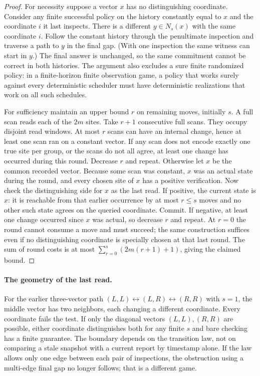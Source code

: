 \documentclass[11pt]{article}
\begin{document}
\begin{proof}
For necessity suppose a vector $x$ has no distinguishing coordinate. Consider any finite successful policy on the history constantly equal to $x$ and the coordinate $i$ it last inspects. There is a different $y\in N_s(x)$ with the same coordinate $i$. Follow the constant history through the penultimate inspection and traverse a path to $y$ in the final gap. (With one inspection the same witness can start in $y$.) The final answer is unchanged, so the same commitment cannot be correct in both histories. The argument also excludes a sure finite randomized policy: in a finite-horizon finite observation game, a policy that works surely against every deterministic scheduler must have deterministic realizations that work on all such schedules.

For sufficiency maintain an upper bound $r$ on remaining moves, initially $s$. A full scan reads each of the $2m$ sites. Take $r+1$ consecutive full scans. They occupy disjoint read windows. At most $r$ scans can have an internal change, hence at least one scan ran on a constant vector. If any scan does not encode exactly one true site per group, or the scans do not all agree, at least one change has occurred during this round. Decrease $r$ and repeat. Otherwise let $x$ be the common recorded vector. Because some scan was constant, $x$ was an actual state during the round, and every chosen site of $x$ has a positive verification. Now check the distinguishing side for $x$ as the last read. If positive, the current state is $x$: it is reachable from that earlier occurrence by at most $r\le s$ moves and no other such state agrees on the queried coordinate. Commit. If negative, at least one change occurred since $x$ was actual, so decrease $r$ and repeat. At $r=0$ the round cannot consume a move and must succeed; the same construction suffices even if no distinguishing coordinate is specially chosen at that last round. The sum of round costs is at most $\sum_{r=0}^s(2m(r+1)+1)$, giving the claimed bound.
\end{proof}

\paragraph{The geometry of the last read.}
For the earlier three-vector path $(L,L)\leftrightarrow(L,R)\leftrightarrow(R,R)$ with $s=1$, the middle vector has two neighbors, each changing a different coordinate. Every coordinate fails the test. If only the diagonal vectors $(L,L),(R,R)$ are possible, either coordinate distinguishes both for any finite $s$ and bare checking has a finite guarantee. The boundary depends on the transition law, not on comparing a stale snapshot with a current report by timestamp alone. If the law allows only one edge between each pair of inspections, the obstruction using a multi-edge final gap no longer follows; that is a different game.
\end{document}
